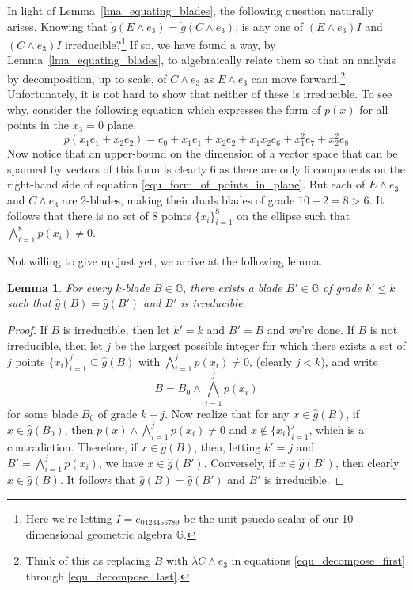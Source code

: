 \documentclass{birkjour}
\newtheorem{lem}[thm]{Lemma}
\theoremstyle{definition}
\theoremstyle{remark}
\numberwithin{equation}{section}
\newcommand{\G}{\mathbb{G}}
\newcommand{\gd}{\dot{g}}
\newcommand{\gh}{\hat{g}}
\begin{document}
In light of Lemma~\ref{lma_equating_blades}, the following question naturally arises.
Knowing that $\gd(E\wedge e_3)=\gd(C\wedge e_3)$, is any one of
$(E\wedge e_3)I$ and $(C\wedge e_3)I$ irreducible?\footnote{Here we're letting $I=e_{0123456789}$
be the unit psuedo-scalar of our 10-dimensional geometric algebra $\G$.}  If so, we have found
a way, by Lemma~\ref{lma_equating_blades}, to algebraically relate them so that an analysis
by decomposition, up to scale, of $C\wedge e_3$
as $E\wedge e_3$ can move forward.\footnote{Think of this as replacing
$B$ with $\lambda C\wedge e_3$ in equations \eqref{equ_decompose_first} through
\eqref{equ_decompose_last}.}
Unfortunately, it is not hard to show
that neither of these is irreducible.  To see why, consider the following equation which
expresses the form of $p(x)$ for all points in the $x_3=0$ plane.
\begin{equation}\label{equ_form_of_points_in_plane}
p(x_1e_1 + x_2e_2) = e_0 + x_1e_1 + x_2e_2 + x_1x_2e_6 + x_1^2e_7 + x_2^2e_8
\end{equation}
Now notice that an upper-bound on the dimension of a vector space that can
be spanned by vectors of this form is clearly 6 as there are only 6 components
on the right-hand side of equation \eqref{equ_form_of_points_in_plane}.
But each of $E\wedge e_3$ and $C\wedge e_3$ are 2-blades, making their
duals blades of grade $10-2=8>6$.  It follows that there is no set of 8 points $\{x_i\}_{i=1}^8$
on the ellipse such that $\bigwedge_{i=1}^8 p(x_i)\neq 0$.

Not willing to give up just yet, we arrive at the following lemma.

\begin{lem}\label{lma_irreducible_form_exists}
For every $k$-blade $B\in\G$, there exists a blade $B'\in\G$ of grade $k'\leq k$
such that $\gh(B)=\gh(B')$ and $B'$ is irreducible.
\end{lem}
\begin{proof}
If $B$ is irreducible, then let $k'=k$ and $B'=B$ and we're done.
If $B$ is not irreducible, then let $j$ be the largest possible integer
for which there exists a set of $j$ points $\{x_i\}_{i=1}^j\subseteq\gh(B)$
with $\bigwedge_{i=1}^j p(x_i)\neq 0$, (clearly $j<k$), and write
\begin{equation*}
B = B_0\wedge\bigwedge_{i=1}^j p(x_i)
\end{equation*}
for some blade $B_0$ of grade $k-j$.  Now realize that for any $x\in\gh(B)$,
if $x\in\gh(B_0)$, then $p(x)\wedge\bigwedge_{i=1}^j p(x_i)\neq 0$ and $x\not\in\{x_i\}_{i=1}^j$,
which is a contradiction.  Therefore, if $x\in\gh(B)$, then, letting $k'=j$ and $B'=\bigwedge_{i=1}^jp(x_i)$,
we have $x\in\gh(B')$.  Conversely, if $x\in\gh(B')$, then clearly $x\in\gh(B)$.  It follows that
$\gh(B)=\gh(B')$ and $B'$ is irreducible.
\end{proof}
\end{document}
